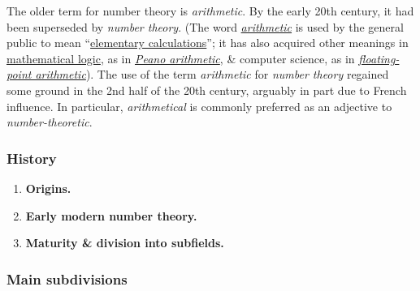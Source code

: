 \documentclass{article}
\begin{document}
The older term for number theory is {\it arithmetic}. By the early 20th century, it had been superseded by {\it number theory}. (The word \href{https://en.wikipedia.org/wiki/Arithmetic}{\it arithmetic} is used by the general public to mean ``\href{https://en.wikipedia.org/wiki/Elementary_arithmetic}{elementary calculations}''; it has also acquired other meanings in \href{https://en.wikipedia.org/wiki/Mathematical_logic}{mathematical logic}, as in \href{https://en.wikipedia.org/wiki/Peano_arithmetic}{\it Peano arithmetic}, \& computer science, as in \href{https://en.wikipedia.org/wiki/Floating-point_arithmetic}{\it floating-point arithmetic}). The use of the term {\it arithmetic} for {\it number theory} regained some ground in the 2nd half of the 20th century, arguably in part due to French influence. In particular, {\it arithmetical} is commonly preferred as an adjective to {\it number-theoretic}.

\subsubsection{History}

\begin{enumerate}
	\item {\bf Origins.}
	\item {\bf Early modern number theory.}
	\item {\bf Maturity \& division into subfields.}
\end{enumerate}

\subsubsection{Main subdivisions}
\end{document}
